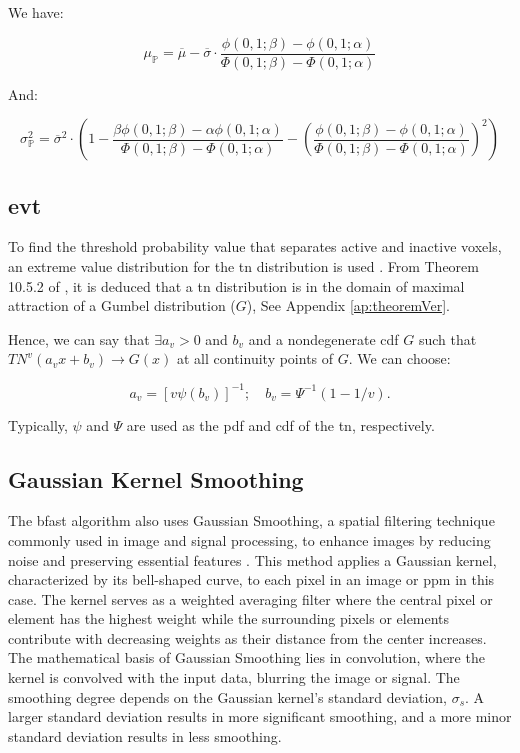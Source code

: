 We have:

\begin{equation} \label{eq:mu_P}
\mu_{\bm{\mathbb{P}}} = \overline{\mu} - \overline{\sigma} \cdot \frac{\phi(0,1;\beta)-\phi(0,1;\alpha)}{\Phi(0,1;\beta)-\Phi(0,1;\alpha)}
\end{equation}

And:

\begin{equation} \label{eq:sigma_P}
\sigma^2_{\bm{\mathbb{P}}} = \overline{\sigma}^2 \cdot \left( 1 - \frac{\beta \phi(0,1;\beta)- \alpha \phi(0,1;\alpha)}{\Phi(0,1;\beta)-\Phi(0,1;\alpha)} - \left( \frac{\phi(0,1;\beta)-\phi(0,1;\alpha)}{\Phi(0,1;\beta)-\Phi(0,1;\alpha)} \right)^2 \right)
\end{equation}

\subsection{\texorpdfstring{\gls{evt}}{EVT}}

To find the threshold probability value that separates active and inactive voxels, an extreme value distribution for the \gls{tn} distribution is used \cite{burkardt2014truncated, nadarajah2004beta}. From Theorem 10.5.2 of \cite{david2004order}, it is deduced that a \gls{tn} distribution is in the domain of maximal attraction of a Gumbel distribution ($G$), See Appendix \ref{ap:theoremVer}.

Hence, we can say that $\exists a_v>0$ and $b_v$ and a nondegenerate \gls{cdf} $G$ such that $TN^v(a_vx+b_v) \rightarrow G(x)$ at all continuity points of $G$. We can choose:

\begin{equation}
a_v = \left[ v\psi(b_v) \right]^{-1}; \quad b_v = \Psi^{-1}(1-1/v).
\label{eq:av_bv}
\end{equation}

Typically, $\psi$ and $\Psi$ are used as the \gls{pdf} and \gls{cdf} of the \gls{tn}, respectively.

\subsection{Gaussian Kernel Smoothing}

The \gls{bfast} algorithm also uses Gaussian Smoothing, a spatial filtering technique commonly used in image and signal processing, to enhance images by reducing noise and preserving essential features \cite{garg2016quality}. This method applies a Gaussian kernel, characterized by its bell-shaped curve, to each pixel in an image or \gls{ppm} in this case. The kernel serves as a weighted averaging filter where the central pixel or element has the highest weight while the surrounding pixels or elements contribute with decreasing weights as their distance from the center increases. The mathematical basis of Gaussian Smoothing lies in convolution, where the kernel is convolved with the input data, blurring the image or signal. The smoothing degree depends on the Gaussian kernel's standard deviation, $\sigma_s$. A larger standard deviation results in more significant smoothing, and a more minor standard deviation results in less smoothing.

